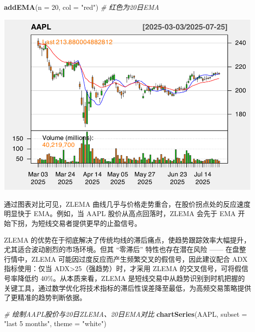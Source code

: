 \documentclass[]{ctexbook}
\newenvironment{Shaded}{\begin{snugshade}}{\end{snugshade}}
\newcommand{\AttributeTok}[1]{\textcolor[rgb]{0.13,0.29,0.53}{#1}}
\newcommand{\CommentTok}[1]{\textcolor[rgb]{0.56,0.35,0.01}{\textit{#1}}}
\newcommand{\DecValTok}[1]{\textcolor[rgb]{0.00,0.00,0.81}{#1}}
\newcommand{\FunctionTok}[1]{\textcolor[rgb]{0.13,0.29,0.53}{\textbf{#1}}}
\newcommand{\NormalTok}[1]{#1}
\newcommand{\StringTok}[1]{\textcolor[rgb]{0.31,0.60,0.02}{#1}}
\begin{document}
\begin{Shaded}
\begin{Highlighting}[]
\FunctionTok{addEMA}\NormalTok{(}\AttributeTok{n =} \DecValTok{20}\NormalTok{, }\AttributeTok{col =} \StringTok{"red"}\NormalTok{)      }\CommentTok{\# 红色为20日EMA}
\end{Highlighting}
\end{Shaded}

\includegraphics[width=0.9\linewidth]{QuantmodHandbook_files/figure-latex/zlema-3}

通过图表对比可见，ZLEMA 曲线几乎与价格走势重合，在股价拐点处的反应速度明显快于 EMA。例如，当 AAPL 股价从高点回落时，ZLEMA 会先于 EMA 开始下拐，为短线交易者提供更早的止盈信号。

ZLEMA 的优势在于彻底解决了传统均线的滞后痛点，使趋势跟踪效率大幅提升，尤其适合波动剧烈的市场环境。但其 ``零滞后'' 特性也存在潜在风险 ------ 在盘整行情中，ZLEMA 可能因过度反应而产生频繁交叉的假信号，因此建议配合 ADX 指标使用：仅当 ADX\textgreater25（强趋势）时，才采用 ZLEMA 的交叉信号，可将假信号率降低约 40\%。从本质来看，ZLEMA 是短线交易中从趋势识别到时机把握的关键工具，通过数学优化将技术指标的滞后性误差降至最低，为高频交易策略提供了更精准的趋势判断依据。

\begin{Shaded}
\begin{Highlighting}[]
\CommentTok{\# 绘制AAPL股价与20日ZLEMA、20日EMA对比}
\FunctionTok{chartSeries}\NormalTok{(AAPL, }\AttributeTok{subset =} \StringTok{"last 5 months"}\NormalTok{, }\AttributeTok{theme =} \StringTok{"white"}\NormalTok{)}
\end{Highlighting}
\end{Shaded}
\end{document}
